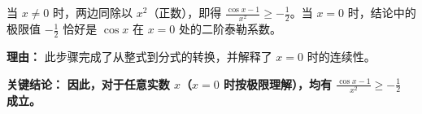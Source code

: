 \begin{examplebox}
\begin{description}[style=nextline, leftmargin=2.8em, labelsep=0.5em, itemsep=0.45em]
    \item[\textbf{第三步（分情况说明）：}] 当 $x \neq 0$ 时，两边同除以 $x^2$（正数），即得 $\frac{\cos x - 1}{x^2} \geq -\frac{1}{2}$。当 $x=0$ 时，结论中的极限值 $-\frac{1}{2}$ 恰好是 $\cos x$ 在 $x=0$ 处的二阶泰勒系数。
    \par\textbf{理由：}
    此步骤完成了从整式到分式的转换，并解释了 $x=0$ 时的连续性。
\end{description}

\textbf{\textcolor{CExample}{关键结论：}} \textbf{因此，对于任意实数 $x$（$x=0$ 时按极限理解），均有 $\frac{\cos x - 1}{x^2} \geq -\frac{1}{2}$ 成立。}
\end{examplebox}
